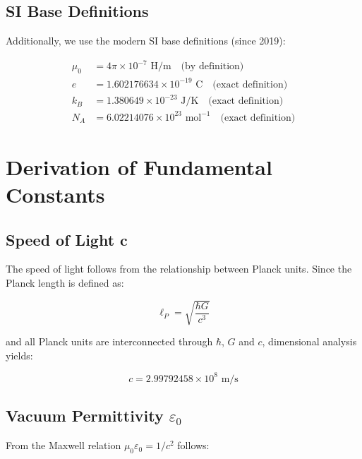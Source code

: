 \documentclass[12pt,a4paper]{article}
\theoremstyle{definition}
\begin{document}
	\subsection{SI Base Definitions}
	
	Additionally, we use the modern SI base definitions (since 2019):
	
	\begin{align}
		\mu_0 &= 4\pi \times 10^{-7} \text{ H/m} \quad \text{(by definition)}\\
		e &= 1.602176634 \times 10^{-19} \text{ C} \quad \text{(exact definition)}\\
		k_B &= 1.380649 \times 10^{-23} \text{ J/K} \quad \text{(exact definition)}\\
		N_A &= 6.02214076 \times 10^{23} \text{ mol}^{-1} \quad \text{(exact definition)}
	\end{align}
	
	\section{Derivation of Fundamental Constants}
	
	\subsection{Speed of Light c}
	
	The speed of light follows from the relationship between Planck units. Since the Planck length is defined as:
	
	\begin{equation}
		\ell_P = \sqrt{\frac{\hbar G}{c^3}}
	\end{equation}
	
	and all Planck units are interconnected through $\hbar$, $G$ and $c$, dimensional analysis yields:
	
	\begin{tcolorbox}[colback=green!5!white,colframe=green!75!black,title=Speed of Light]
		\begin{equation}
			\boxed{c = 2.99792458 \times 10^8 \text{ m/s}}
		\end{equation}
	\end{tcolorbox}
	
	\subsection{Vacuum Permittivity $\varepsilon_0$}
	
	From the Maxwell relation $\mu_0 \varepsilon_0 = 1/c^2$ follows:
	
\end{document}
